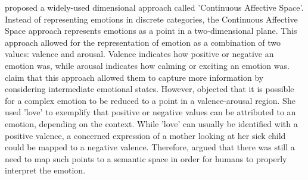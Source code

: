 \newline\newline
\citet{Hupont:2010:FacialEmotionsIn2DAffectiveSpace} proposed a widely-used dimensional approach called 'Continuous Affective Space'. Instead of representing emotions in discrete categories, the Continuous Affective Space approach represents emotions as a point in a two-dimensional plane. This approach allowed for the representation of emotion as a combination of two values: valence and arousal. Valence indicates how positive or negative an emotion was, while arousal indicates how calming or exciting an emotion was. \citet{Hupont:2010:FacialEmotionsIn2DAffectiveSpace} claim that this approach allowed them to capture more information by considering intermediate emotional states.
\newline\newline
However, \citet{Salah:2018:VideoBasedER} objected that it is possible for a complex emotion to be reduced to a point in a valence-arousal region. She used ’love’ to exemplify that positive or negative values can be attributed to an emotion, depending on the context. While 'love' can usually be identified with a positive valence, a concerned expression of a mother looking at her sick child could be mapped to a negative valence. Therefore, \citet{Salah:2018:VideoBasedER} argued that there was still a need to map such points to a semantic space in order for humans to properly interpret the emotion.
